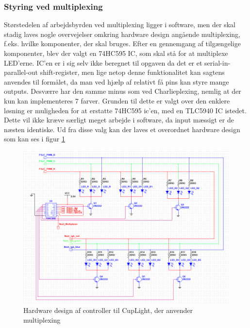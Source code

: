 \documentclass[HardwareDesign/HardwareDesign_main.tex]{subfiles}
\begin{document}
\subsubsection{Styring ved multiplexing}
Størstedelen af arbejdsbyrden ved multiplexing ligger i software, men der skal stadig laves nogle overvejelser omkring hardware design angående multiplexing, f.eks. hvilke komponenter, der skal bruges. Efter en gennemgang af tilgængelige komponenter, blev der valgt en 74HC595 IC, som skal stå for at multiplexe LED'erne. IC'en er i sig selv ikke beregnet til opgaven da det er et serial-in-parallel-out shift-register, men lige netop denne funktionalitet kan sagtens anvendes til formålet, da man ved hjælp af relativt få pins kan styre mange outputs. Desværre har den samme minus som ved Charlieplexing, nemlig at der kun kan implementeres 7 farver. Grunden til dette er valgt over den enklere løsning er muligheden for at erstatte 74HC595 ic'en, med en TLC5940 IC istedet. Dette vil ikke kræve særligt meget arbejde i software, da input mæssigt er de næsten identiske. Ud fra disse valg kan der laves et overordnet hardware design som kan ses i figur \ref{fig:CupLight_HW_Multiplexing}
\begin{figure}[H]
    \centering
    \includegraphics[width=\textwidth]{HardwareDesign/CupLight/graphics/CupLight.png}
    \caption{Hardware design af controller til CupLight, der anvender multiplexing}
    \label{fig:CupLight_HW_Multiplexing}
\end{figure}
\end{document}
